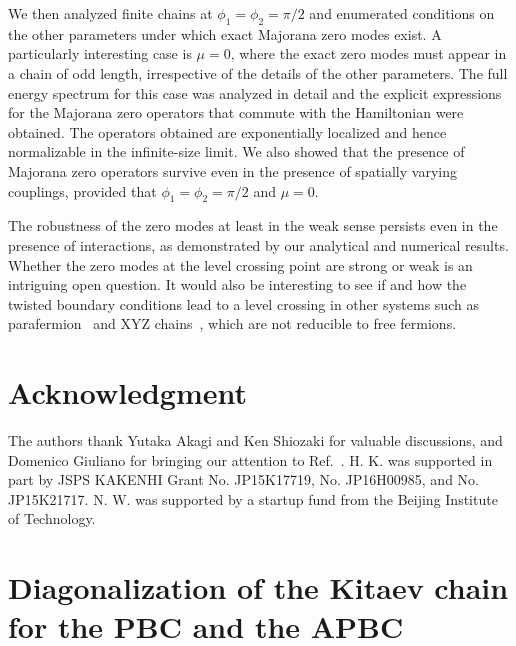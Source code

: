 \documentclass[aps, prb, showpacs, twocolumn, %
amssymb,superscriptaddress]{revtex4}
\begin{document}
We then analyzed finite chains at $\phi_1=\phi_2=\pi/2$ and enumerated conditions on the other parameters under which exact Majorana zero modes exist. A particularly interesting case is $\mu=0$, where the exact zero modes must appear in a chain of odd length, irrespective of the details of the other parameters. The full energy spectrum for this case was analyzed in detail and the explicit expressions for the Majorana zero operators that commute with the Hamiltonian were obtained. The operators obtained are exponentially localized and hence normalizable in the infinite-size limit. We also showed that the presence of Majorana zero operators survive even in the presence of spatially varying couplings, provided that $\phi_1=\phi_2=\pi/2$ and $\mu=0$. 

The robustness of the zero modes at least in the weak sense persists even in the presence of interactions, as demonstrated by our analytical and numerical results. Whether the zero modes at the level crossing point are strong or weak is an intriguing open question. It would also be interesting to see if and how the twisted boundary conditions lead to a level crossing in other systems such as parafermion~\cite{Fendley12, Clarke-14, KlinovajaLoss14, Mong-14, Jermyn-14, Aris-15, Alicea-16} and XYZ chains~\cite{Fendley-XYZ}, which are not reducible to free fermions. 


\section*{Acknowledgment}
The authors thank Yutaka Akagi and Ken Shiozaki for valuable discussions, and Domenico Giuliano for bringing our attention to Ref.~. 
H. K. was supported in part by JSPS KAKENHI Grant No. JP15K17719, No. JP16H00985, and No. JP15K21717. N. W. was supported by a startup fund from the Beijing Institute of Technology.


\appendix
\section{Diagonalization of the Kitaev chain for the PBC and the APBC}
\label{APP_PAP}
\end{document}
